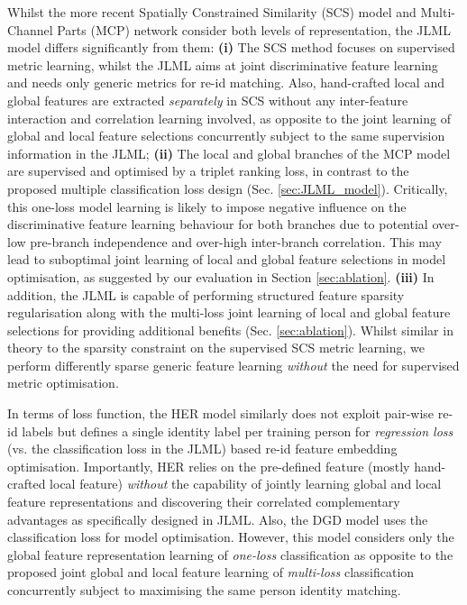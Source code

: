 \documentclass{article}
\begin{document}
Whilst the more recent Spatially Constrained Similarity (SCS) model 
\cite{chen2016similarity}
and Multi-Channel Parts (MCP) network \cite{Cheng_TCP} consider both levels
of representation, the JLML model differs significantly from them:
{\bf (i)} The SCS method focuses on supervised metric learning, 
whilst the JLML aims at joint discriminative feature learning 
and needs only generic metrics for re-id matching.
Also, hand-crafted local and global features are extracted {\em separately} in SCS 
without any inter-feature interaction and correlation learning involved,
as opposite to the joint learning of global and local feature selections concurrently
subject to the same supervision information in the JLML; 
{\bf (ii)} The local and global branches of the MCP model are supervised and 
optimised by a triplet ranking loss, in contrast to
the proposed multiple classification loss design (Sec. \ref{sec:JLML_model}). 
Critically, this one-loss model learning is likely to impose negative influence on the discriminative 
feature learning behaviour for both branches
due to potential over-low pre-branch independence and over-high inter-branch correlation.
This may lead to suboptimal joint learning of local and global feature selections in model optimisation, 
as suggested by our evaluation in Section \ref{sec:ablation}.
{\bf (iii)} In addition, the JLML is capable of performing structured feature sparsity
regularisation along with the multi-loss joint learning of local and global feature
selections for providing additional benefits (Sec. \ref{sec:ablation}).
Whilst similar in theory to the sparsity constraint on the supervised SCS metric learning,
we perform differently sparse generic feature learning 
{\em without} the need for supervised metric optimisation.


In terms of loss function, the HER model \cite{wang2016highly} 
similarly does not exploit pair-wise re-id labels but defines
a single identity label per training person for 
{\em regression loss} (vs. the classification loss in the JLML)
based re-id feature embedding optimisation.
Importantly, HER relies on the pre-defined feature (mostly hand-crafted local feature) 
{\em without} the capability of jointly learning global and local feature
representations and discovering their correlated complementary advantages
as specifically designed in JLML. 
Also, the DGD \cite{xiao2016learning} model uses
the classification loss for model optimisation. 
However, this model considers only the global feature representation learning
of {\em one-loss} classification 
as opposite to the proposed joint global and local feature learning of {\em multi-loss} classification
concurrently subject to maximising the same person identity matching.
\end{document}
